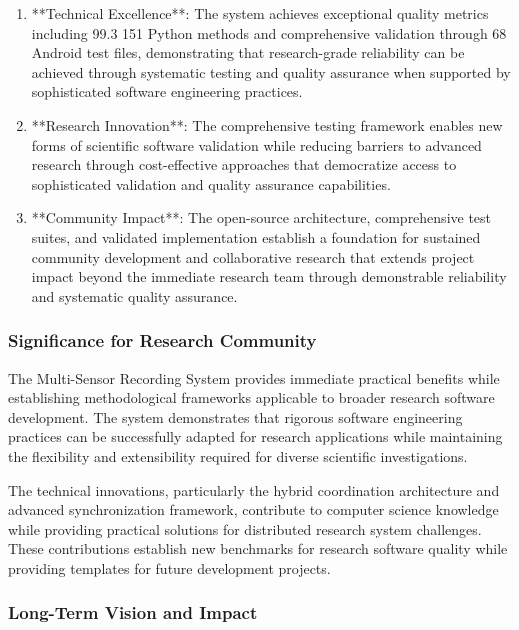 \documentclass[11pt,a4paper]{article}
\begin{document}
\begin{enumerate}
\item **Technical Excellence**: The system achieves exceptional quality metrics including 99.3%
   151 Python methods and comprehensive validation through 68 Android test files, demonstrating that research-grade
   reliability can be achieved through systematic testing and quality assurance when supported by sophisticated
   software engineering practices.

\item **Research Innovation**: The comprehensive testing framework enables new forms of scientific software validation
   while reducing barriers to advanced research through cost-effective approaches that democratize access to
   sophisticated validation and quality assurance capabilities.

\item **Community Impact**: The open-source architecture, comprehensive test suites, and validated implementation
   establish a foundation for sustained community development and collaborative research that extends project impact
   beyond the immediate research team through demonstrable reliability and systematic quality assurance.

\end{enumerate}
\subsubsection{Significance for Research Community}

The Multi-Sensor Recording System provides immediate practical benefits while establishing methodological frameworks
applicable to broader research software development. The system demonstrates that rigorous software engineering
practices can be successfully adapted for research applications while maintaining the flexibility and extensibility
required for diverse scientific investigations.

The technical innovations, particularly the hybrid coordination architecture and advanced synchronization framework,
contribute to computer science knowledge while providing practical solutions for distributed research system challenges.
These contributions establish new benchmarks for research software quality while providing templates for future
development projects.

\subsubsection{Long-Term Vision and Impact}
\end{document}
